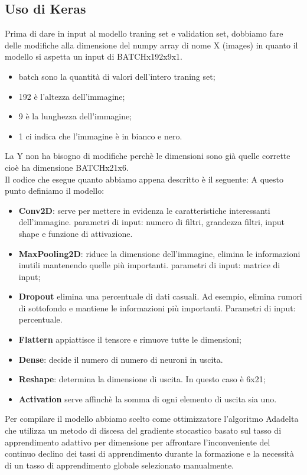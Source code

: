 \subsection{Uso di Keras}
Prima di dare in input al modello traning set e validation set, dobbiamo fare delle modifiche alla dimensione del numpy array di nome X (images) in quanto il modello si aspetta un input di BATCHx192x9x1.
\begin{itemize}
	\item batch sono la quantità di valori dell'intero traning set;
	\item 192 è l'altezza dell'immagine;
	\item 9 è la lunghezza dell'immagine;
	\item 1 ci indica che l'immagine è in bianco e nero.
\end{itemize}
La Y non ha bisogno di modifiche perchè le dimensioni sono già quelle corrette cioè ha dimensione BATCHx21x6.\\
Il codice che esegue quanto abbiamo appena descritto è il seguente:
\vspace*{2ex}
\vspace*{2ex}
A questo punto definiamo il modello:
\begin{itemize}
	\item \textbf{Conv2D}: serve per mettere in evidenza le caratteristiche interessanti dell'immagine. parametri di input: numero di filtri, grandezza filtri, input shape e funzione di attivazione.
	\item \textbf{MaxPooling2D}: riduce la dimensione dell'immagine, elimina le informazioni inutili mantenendo quelle più importanti. parametri di input: matrice di input;
	\item \textbf{Dropout} elimina una percentuale di dati casuali. Ad esempio, elimina rumori di sottofondo e mantiene le informazioni più importanti. Parametri di input: percentuale.
	\item \textbf{Flattern} appiattisce il tensore e rimuove tutte le dimensioni;
	\item \textbf{Dense}: decide il numero di numero di neuroni in uscita.
	\item \textbf{Reshape}: determina la dimensione di uscita. In questo caso è 6x21;
	\item \textbf{Activation} serve affinchè la somma di ogni elemento di uscita sia uno.
\end{itemize}
Per compilare il modello abbiamo scelto come ottimizzatore l'algoritmo Adadelta che utilizza un metodo di discesa del gradiente stocastico basato sul tasso di apprendimento adattivo per dimensione per affrontare l'inconveniente del continuo declino dei tassi di apprendimento durante la formazione e la necessità di un tasso di apprendimento globale selezionato manualmente.
